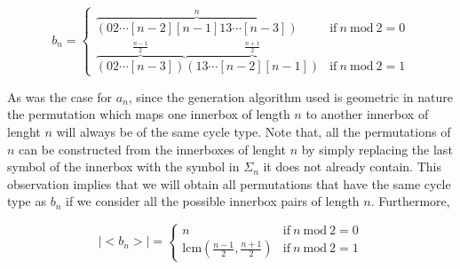 \documentclass[a4paper,10pt]{article}
\theoremstyle{definition}
\begin{document}
\begin{equation}
b_n = \left\{
\begin{array}{ll}
\overbrace{(02\cdots[n-2][n-1]13\cdots[n-3])}^{n}&\textrm{if}~n~\textrm{mod}~2=0\\
\overbrace{(02\cdots[n-3])}^{\frac{n-1}{2}}\overbrace{(13\cdots[n-2][n-1])}^{\frac{n+1}{2}}&\textrm{if}~n~\textrm{mod}~2=1 
\end{array}
\right.
\end{equation}

As was the case for $a_n$, since the generation algorithm used is geometric in nature the permutation which maps one innerbox of length $n$ to another innerbox of lenght $n$ will always be of the same cycle type. Note that, all the  permutations of $n$ can be constructed from the innerboxes of lenght $n$ by simply replacing the last symbol of the innerbox with the symbol in $\Sigma_n$ it does not already contain. This observation implies that we will obtain all permutations that have the same cycle type as $b_n$ if we consider all the possible innerbox pairs of length $n$. Furthermore,

\begin{equation}
|\!\!<\!\!b_n\!\!>\!\!|= \left\{
\begin{array}{ll}
n &\textrm{if}~n~\textrm{mod}~2=0\\
\textrm{lcm}(\frac{n-1}{2},\frac{n+1}{2}) &\textrm{if}~n~\textrm{mod}~2=1 
\end{array}
\right.
\end{equation}


% 
 
\end{document}
